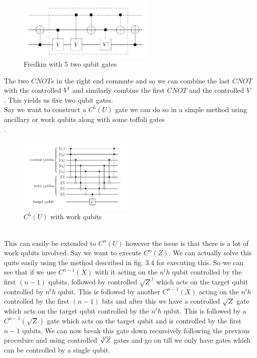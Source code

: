 \documentclass{report}
\begin{document}
\begin{figure}[ht]
\centering
\includegraphics[width = 0.6\textwidth]{images/fredkin with 5 gates.png}
\caption{Fredkin with 5 two qubit gates}
\end{figure}
The two $CNOTs$ in the right end commute and so we can combine the last $CNOT$ with the controlled $V^{\dagger}$ and similarly combine the first $CNOT$ and the controlled $V$. This yields us five two qubit gates.\\
Say we want to construct a $C^5(U)$ gate we can do so in a simple method using ancillary or work qubits along with some toffoli gates\\.
\begin{figure}[ht]
\centering
\includegraphics[width = 0.5\textwidth]{images/c5u.png}
\caption{$C^5(U)$ with work qubits}
\end{figure}\\
This can easily be extended to $C^n(U)$ however the issue is that there is a lot of work qubits involved. Say we want to execute $C^n(Z)$.
We can actually solve this quite easily using the method described in fig. 3.4 for executing this. So we can see that if we use $C^{n-1}(X)$ with it acting on the $n^th$ qubit controlled by the first $(n-1)$ qubits, followed by controlled $\sqrt{Z}^{\dagger}$ which acts on the target qubit controlled by $n^th$ qubit. 
This is followed by another $C^{n-1}(X)$  acting on the $n^th$ controlled by the first $(n-1)$ bits and after this we have a controlled $\sqrt{Z}$ gate which acts on the target qubit controlled by the $n^th$ qubit. This is followed by a $C^{n-1}(\sqrt{Z})$ gate which acts on the target qubit and is controlled by the first $n-1$ qubits. We can now break this gate down recursively following the previous procedure and using controlled $\sqrt[\leftroot{-1}\uproot{1}4]{Z}$ gates and go on till we only have gates which can be controlled by a single qubit.\\
\end{document}
